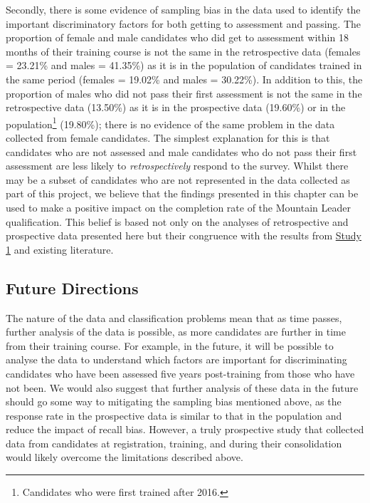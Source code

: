 \documentclass[
  12pt,
  a4paper,
]{book}
\begin{document}
Secondly, there is some evidence of sampling bias in the data used to identify the important discriminatory factors for both getting to assessment and passing. The proportion of female and male candidates who did get to assessment within 18 months of their training course is not the same in the retrospective data (females = 23.21\% and males = 41.35\%) as it is in the population of candidates trained in the same period (females = 19.02\% and males = 30.22\%). In addition to this, the proportion of males who did not pass their first assessment is not the same in the retrospective data (13.50\%) as it is in the prospective data (19.60\%) or in the population\footnote{Candidates who were first trained after 2016.} (19.80\%); there is no evidence of the same problem in the data collected from female candidates. The simplest explanation for this is that candidates who are not assessed and male candidates who do not pass their first assessment are less likely to \emph{retrospectively} respond to the survey. Whilst there may be a subset of candidates who are not represented in the data collected as part of this project, we believe that the findings presented in this chapter can be used to make a positive impact on the completion rate of the Mountain Leader qualification. This belief is based not only on the analyses of retrospective and prospective data presented here but their congruence with the results from \protect\hyperlink{ml-qualitative}{Study 1} and existing literature.

\hypertarget{ml-pra-future-directions}{%
\subsection{Future Directions}\label{ml-pra-future-directions}}

The nature of the data and classification problems mean that as time passes, further analysis of the data is possible, as more candidates are further in time from their training course. For example, in the future, it will be possible to analyse the data to understand which factors are important for discriminating candidates who have been assessed five years post-training from those who have not been. We would also suggest that further analysis of these data in the future should go some way to mitigating the sampling bias mentioned above, as the response rate in the prospective data is similar to that in the population and reduce the impact of recall bias. However, a truly prospective study that collected data from candidates at registration, training, and during their consolidation would likely overcome the limitations described above.
\end{document}
